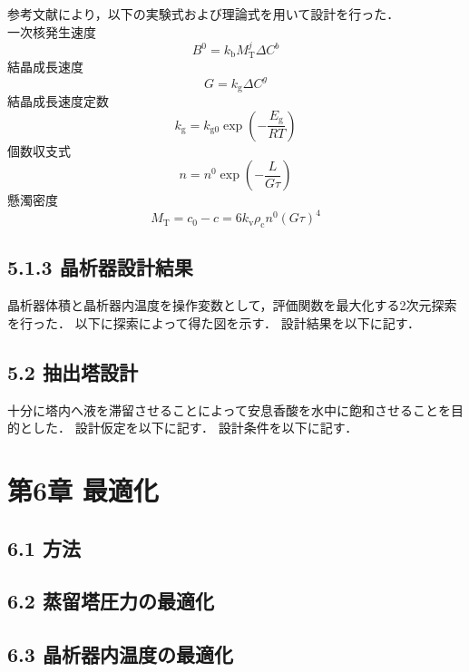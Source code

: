 \documentclass[a4j, titlepage]{jsarticle}
\begin{document}
参考文献\cite{article1}により，以下の実験式および理論式を用いて設計を行った．\\
一次核発生速度
\begin{equation}
    B^0 = k_{{\mathrm b}}M_{{\mathrm T}}^j \Delta C^b
\end{equation}
結晶成長速度
\begin{equation}
    G = k_{{\mathrm g}}\Delta C^g
\end{equation}
結晶成長速度定数
\begin{equation}
    k_{{\mathrm g}} = k_{{\mathrm g0}} \exp \left(-\frac{E_{{\mathrm g}}}{RT} \right)
\end{equation}
個数収支式
\begin{equation}
    n=n^0 \exp \left( -\frac{L}{G\tau} \right)
\end{equation}
懸濁密度
\begin{equation}
    M_{{\mathrm T}} = c_0-c = 6k_{{\mathrm v}}\rho_{{\mathrm c}}n^0(G\tau)^4
\end{equation}

\subsection*{5.1.3 晶析器設計結果}
晶析器体積と晶析器内温度を操作変数として，評価関数を最大化する2次元探索を行った．
以下に探索によって得た図を示す．
設計結果を以下に記す．

\subsection*{5.2 抽出塔設計}
十分に塔内へ液を滞留させることによって安息香酸を水中に飽和させることを目的とした．
設計仮定を以下に記す．
設計条件を以下に記す．

\newpage
\section*{第6章 最適化}
\subsection*{6.1 方法}

\subsection*{6.2 蒸留塔圧力の最適化}

\subsection*{6.3 晶析器内温度の最適化}
\end{document}
